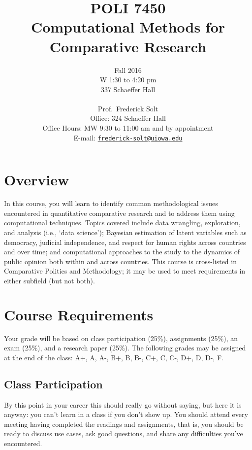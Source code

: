 \documentclass[11pt]{article}\usepackage[]{graphicx}\usepackage[]{color}
\begin{document}
\title{POLI 7450 \\ Computational Methods for\\ Comparative Research}

\author{Fall 2016\\
W 1:30 to 4:20 pm\\
337 Schaeffer Hall\\
\\
Prof.~Frederick Solt\\
Office: 324 Schaeffer Hall \\
Office Hours: MW  9:30 to 11:00 am and by appointment\\
E-mail: \href{mailto:frederick-solt@uiowa.edu}{\texttt{frederick-solt@uiowa.edu}}\\
}
\date{ }
\maketitle 

\section{Overview}
In this course, you will learn to identify common methodological issues encountered in quantitative comparative research and to address them using computational techniques.  Topics covered include data wrangling, exploration, and analysis (i.e., `data science'); Bayesian estimation of latent variables such as democracy, judicial independence, and respect for human rights across countries and over time; and computational approaches to the study to the dynamics of public opinion both within and across countries. This course is cross-listed in Comparative Politics and Methodology; it may be used to meet requirements in either subfield (but not both).

\pagebreak
\section{Course Requirements}
Your grade will be based on class participation (25\%), assignments (25\%), an exam (25\%), and a research paper (25\%).  The following grades may be assigned at the end of the class: A+, A, A-, B+, B, B-, C+, C, C-, D+, D, D-, F.
%
\subsection{Class Participation}
By this point in your career this should really go without saying, but here it is anyway: you can't learn in a class if you don't show up.  
You should attend every meeting having completed the readings and assignments, that is, you should be ready to discuss use cases, ask good questions, and share any difficulties you've encountered.  
\end{document}
